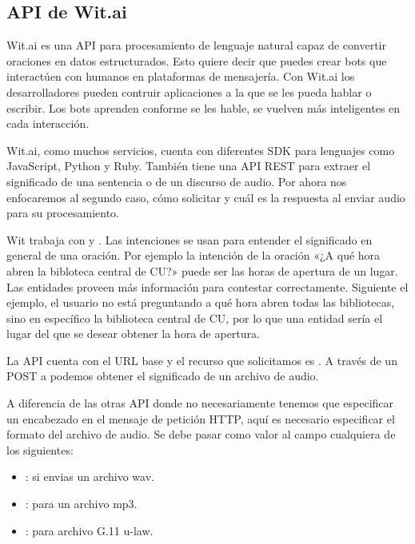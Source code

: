 \subsection{API de Wit.ai}
\label{\detokenize{chapter_one/apis_rest:api-de-wit-ai}}
Wit.ai es una API para procesamiento de lenguaje natural capaz de convertir
oraciones en datos estructurados. Esto quiere decir que puedes crear bots
que interactúen con humanos en plataformas de mensajería. Con Wit.ai los
desarrolladores pueden contruir aplicaciones a la que se les pueda hablar o
escribir. Los bots aprenden conforme se les hable, se vuelven más inteligentes
en cada interacción.

Wit.ai, como muchos servicios, cuenta con diferentes SDK para lenguajes como
JavaScript, Python y Ruby. También tiene una API REST para extraer el significado
de una sentencia o de un discurso de audio. Por ahora nos enfocaremos
al segundo caso, cómo solicitar y cuál es la respuesta al enviar audio
para su procesamiento.

Wit trabaja con  y . Las intenciones se usan para entender
el significado en general de una oración. Por ejemplo la intención
de la oración «¿A qué hora abren la bibloteca central de CU?»
puede ser las horas de apertura de un lugar. Las entidades
proveen más información para contestar correctamente. Siguiente el ejemplo,
el usuario no está preguntando a qué hora abren todas las bibliotecas,
sino en específico la biblioteca central de CU, por lo que
una entidad sería el lugar del que se desear obtener la hora de apertura.

La API cuenta con el URL base  y el recurso que
solicitamos es . A través de un POST a 
podemos obtener el significado de un archivo de audio.

A diferencia de las otras API donde no necesariamente tenemos que especificar
un encabezado en el mensaje de petición HTTP, aquí es necesario especificar
el formato del archivo de audio. Se debe pasar como valor al campo
 cualquiera de los siguientes:
\begin{itemize}
\item {} 
: si envias un archivo wav.

\item {} 
: para un archivo mp3.

\item {} 
: para archivo G.11 u-law.

\end{itemize}

